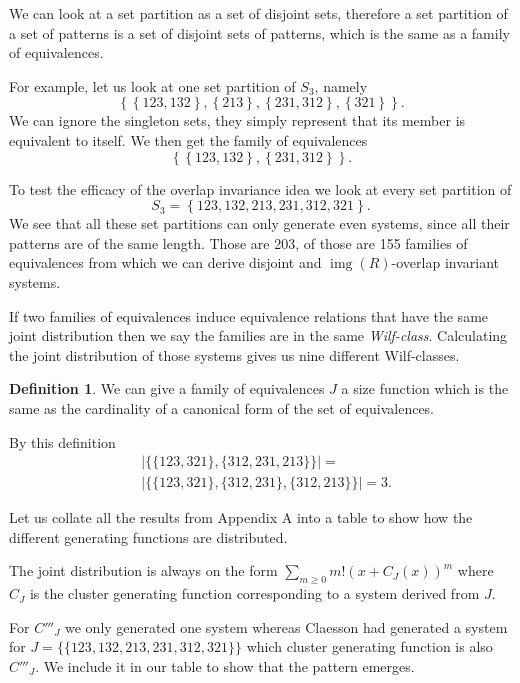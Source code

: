 \documentclass[a4paper, 11pt, english]{article}
\theoremstyle{definition}
\newtheorem{definition}[theorem]{Definition}
\newcommand{\Sym}{S}
\DeclareMathOperator{\img}{img}
\begin{document}
We can look at a set partition as a set of disjoint sets, therefore a set partition of a set of
patterns is a set of disjoint sets of patterns, which is the same as a family of
equivalences.

For example, let us look at one set partition of $\Sym_3$, namely 
\[
  \left\{ \left\{ 123, 132 \right\}, \left\{ 213 \right\}, \left\{ 231, 312 \right\}, \left\{ 321
  \right\} \right\}.
\]
We can ignore the singleton sets, they simply represent that its member is equivalent to itself. We
then get the family of equivalences
\[
  \left\{ \left\{ 123, 132 \right\}, \left\{ 231, 312 \right\} \right\}.
\]

To test the efficacy of the overlap invariance idea we look at every set partition of 
\[
  \Sym_3 = \left\{ 123, 132, 213, 231, 312, 321 \right\}.
\]
We see that all these set partitions can only generate even systems, since all their patterns are of
the same length.
Those are 203, of those are 155 families of equivalences from which we can derive disjoint and
$\img(R)$-overlap invariant systems. 

If two families of equivalences induce equivalence relations that have the same joint distribution
then we say the families are in the same \emph{Wilf-class}.
Calculating the joint distribution of those systems gives us nine different Wilf-classes.

\begin{definition}
    We can give a family of equivalences $J$ a size function which is the same
    as the cardinality of a canonical form of the set of equivalences.

    By this definition 
    \begin{align*}
      & | \{ \{ 123, 321 \}, \{ 312, 231, 213 \} \}| =  \\
      & | \{ \{ 123, 321 \}, \{ 312, 231 \}, \{ 312, 213 \} \} | =  3.
    \end{align*}
\end{definition}

Let us collate all the results from Appendix A into a table to show how the
different generating functions are distributed.

The joint distribution is always on the form $\sum_{m \geq 0}m!(x+C_J(x))^m$ where $C_J$
is the cluster generating function corresponding to a system derived from $J$.

For $C'''_J$ we only generated one system whereas Claesson had generated a system for
$J = \{\{ 123, 132, 213, 231, 312, 321 \}\}$ which cluster generating function
is also $C'''_J$. We include it in our table to show that the pattern emerges.
\end{document}
